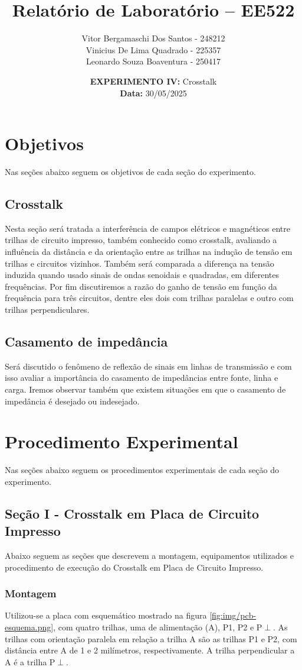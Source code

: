 \documentclass[12pt]{article}
\author{
  Vitor Bergamaschi Dos Santos - 248212\\
  Vinicius De Lima Quadrado - 225357\\
  Leonardo Souza Boaventura - 250417
}
\title{\textbf{Relatório de Laboratório -- EE522}}
\date{\textbf{EXPERIMENTO IV:} Crosstalk
\\ \textbf{Data:} 30/05/2025}
\begin{document}
\maketitle

\section{Objetivos}
Nas seções abaixo seguem os objetivos de cada seção do experimento.

\subsection{Crosstalk}
Nesta seção será tratada a interferência de campos elétricos e
magnéticos entre trilhas de circuito impresso, também conhecido como
crosstalk, avaliando a influência da distância e da orientação entre
as trilhas na indução de tensão em trilhas e circuitos vizinhos.
Também será comparada a diferença na tensão induzida quando usado
sinais de ondas senoidais e quadradas, em diferentes frequências.
Por fim discutiremos a razão do ganho de tensão em função da
frequência para três circuitos, dentre eles dois com trilhas
paralelas e outro com trilhas perpendiculares.

\subsection{Casamento de impedância}
Será discutido o fenômeno de reflexão de sinais em linhas de
transmissão e com isso avaliar a importância do casamento de
impedâncias entre fonte, linha e carga. Iremos observar também que
existem situações em que o casamento de impedância é desejado ou indesejado.

\section{Procedimento Experimental}
Nas seções abaixo seguem os procedimentos experimentais de cada seção
do experimento.

\subsection{Seção I - Crosstalk em Placa de Circuito Impresso}

Abaixo seguem as seções que descrevem a montagem, equipamentos
utilizados e procedimento de execução do Crosstalk em Placa de
Circuito Impresso.

\subsubsection{Montagem}
Utilizou-se a placa com esquemático mostrado na figura \ref{fig:img/pcb-esquema.png}, com quatro
trilhas, uma de alimentação (A), P1, P2 e P$\perp$.
As trilhas com orientação paralela em relação a trilha A são as
trilhas P1 e P2, com distância entre A de 1 e 2 milímetros,
respectivamente. A trilha perpendicular a A é a trilha P$\perp$.
\end{document}
